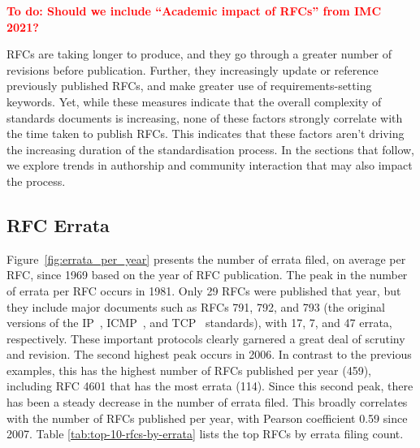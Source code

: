 \documentclass[twocolumn,10pt]{article}
\newcommand{\todo}[1]{\textbf{\textcolor{red}{To do: #1}}}
\newcommand{\pb}[1]{\vspace{0.75ex}\noindent{\textbf{#1}}}
\begin{document}
\todo{Should we include ``Academic impact of RFCs'' from IMC 2021?}


\pb{Summary:}
RFCs are taking longer to produce, and they go through a greater number of
revisions before publication. Further, they increasingly update or
reference previously published RFCs, and make greater use of
requirements-setting keywords. Yet, while these measures indicate that the
overall complexity of standards documents is increasing, none of these
factors strongly correlate with the time taken to publish RFCs. This
indicates that these factors aren't driving the increasing duration of the
standardisation process. In the sections that follow, we explore trends in
authorship and community interaction that may also impact the process.


\subsection{RFC Errata}


\pb{Errata over Time:}
Figure~\ref{fig:errata_per_year} presents the number of errata filed, on
average per RFC, since 1969 based on the year of RFC publication.  The peak
in the number of errata per RFC occurs in 1981. Only 29 RFCs were published
that year, but they include major documents such as RFCs 791, 792, and 793
(the original versions of the IP~\cite{rfc791}, ICMP~\cite{rfc792}, and
TCP~\cite{rfc793} standards), with 17, 7, and 47 errata, respectively.
These important protocols clearly garnered a great deal of scrutiny and
revision.  The second highest peak occurs in 2006.  In contrast to the
previous examples, this has the highest number of RFCs published per year
(459), including RFC 4601 \cite{RFC4601} that has the most errata (114).
Since this second peak, there has been a steady decrease in the number of
errata filed.  This broadly correlates with the number of RFCs published
per year, with Pearson coefficient 0.59 since 2007.  Table
\ref{tab:top-10-rfcs-by-errata} lists the top RFCs by errata filing count.
\end{document}
